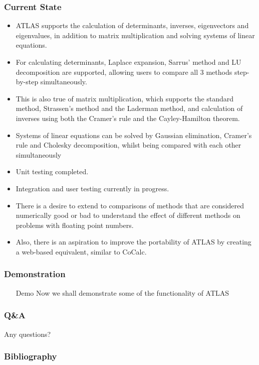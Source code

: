 \begin{frame}[allowframebreaks]
\frametitle{Current State}\pause
\begin{itemize}[<+->]
\item ATLAS supports the calculation of determinants, inverses, eigenvectors and eigenvalues, in addition to matrix multiplication and solving systems of linear equations.
\item For calculating determinants, Laplace expansion, Sarrus' method and LU decomposition are supported, allowing users to compare all 3 methods step-by-step simultaneously.
\item This is also true of matrix multiplication, which supports the standard method, Strassen's method and the Laderman method, and calculation of inverses using both the Cramer's rule and the Cayley-Hamilton theorem.
\item Systems of linear equations can be solved by Gaussian elimination, Cramer's rule and Cholesky decomposition, whilst being compared with each other simultaneously
\item Unit testing completed.
\item Integration and user testing currently in progress.
\item There is a desire to extend to comparisons of methods that are considered numerically good or bad to understand the effect of different methods on problems with floating point numbers.
\item Also, there is an aspiration to improve the portability of ATLAS by creating a web-based equivalent, similar to CoCalc.
\end{itemize}
\end{frame}

\begin{frame}
\frametitle{Demonstration}\pause
\begin{itemize}[<+->]
\item[Demo] Now we shall demonstrate some of the functionality of ATLAS
\end{itemize}
\end{frame}

\begin{frame}
\frametitle{Q\&A}\pause
\begin{description}[<+->]
\item[?]Any questions?
\end{description}
\end{frame}

\begin{frame}[allowframebreaks]
\frametitle{Bibliography}

\end{frame}



